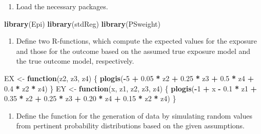 \documentclass[
]{book}
\newenvironment{Shaded}{\begin{snugshade}}{\end{snugshade}}
\newcommand{\ControlFlowTok}[1]{\textcolor[rgb]{0.13,0.29,0.53}{\textbf{#1}}}
\newcommand{\DecValTok}[1]{\textcolor[rgb]{0.00,0.00,0.81}{#1}}
\newcommand{\FloatTok}[1]{\textcolor[rgb]{0.00,0.00,0.81}{#1}}
\newcommand{\FunctionTok}[1]{\textcolor[rgb]{0.13,0.29,0.53}{\textbf{#1}}}
\newcommand{\NormalTok}[1]{#1}
\newcommand{\OtherTok}[1]{\textcolor[rgb]{0.56,0.35,0.01}{#1}}
\newcommand{\SpecialCharTok}[1]{\textcolor[rgb]{0.81,0.36,0.00}{\textbf{#1}}}
\providecommand{\tightlist}{%
  \setlength{\itemsep}{0pt}\setlength{\parskip}{0pt}}
\begin{document}
\begin{enumerate}
\def\labelenumi{\arabic{enumi}.}
\tightlist
\item
  Load the necessary packages.
\end{enumerate}

\begin{Shaded}
\begin{Highlighting}[]
\FunctionTok{library}\NormalTok{(Epi)}
\FunctionTok{library}\NormalTok{(stdReg)}
\FunctionTok{library}\NormalTok{(PSweight)}
\end{Highlighting}
\end{Shaded}

\begin{enumerate}
\def\labelenumi{\arabic{enumi}.}
\setcounter{enumi}{1}
\tightlist
\item
  Define two R-functions, which compute the expected values
  for the exposure and those for the outcome based on the assumed
  true exposure model and the true outcome model, respectively.
\end{enumerate}

\begin{Shaded}
\begin{Highlighting}[]
\NormalTok{EX }\OtherTok{\textless{}{-}} \ControlFlowTok{function}\NormalTok{(z2, z3, z4) \{}
  \FunctionTok{plogis}\NormalTok{(}\SpecialCharTok{{-}}\DecValTok{5} \SpecialCharTok{+} \FloatTok{0.05} \SpecialCharTok{*}\NormalTok{ z2 }\SpecialCharTok{+} \FloatTok{0.25} \SpecialCharTok{*}\NormalTok{ z3 }\SpecialCharTok{+} \FloatTok{0.5} \SpecialCharTok{*}\NormalTok{ z4 }\SpecialCharTok{+} \FloatTok{0.4} \SpecialCharTok{*}\NormalTok{ z2 }\SpecialCharTok{*}\NormalTok{ z4)}
\NormalTok{\}}
\NormalTok{EY }\OtherTok{\textless{}{-}} \ControlFlowTok{function}\NormalTok{(x, z1, z2, z3, z4) \{}
  \FunctionTok{plogis}\NormalTok{(}\SpecialCharTok{{-}}\DecValTok{1} \SpecialCharTok{+}\NormalTok{ x }\SpecialCharTok{{-}} \FloatTok{0.1} \SpecialCharTok{*}\NormalTok{ z1 }\SpecialCharTok{+} \FloatTok{0.35} \SpecialCharTok{*}\NormalTok{ z2 }\SpecialCharTok{+} \FloatTok{0.25} \SpecialCharTok{*}\NormalTok{ z3 }\SpecialCharTok{+}
    \FloatTok{0.20} \SpecialCharTok{*}\NormalTok{ z4 }\SpecialCharTok{+} \FloatTok{0.15} \SpecialCharTok{*}\NormalTok{ z2 }\SpecialCharTok{*}\NormalTok{ z4)}
\NormalTok{\}}
\end{Highlighting}
\end{Shaded}

\begin{enumerate}
\def\labelenumi{\arabic{enumi}.}
\setcounter{enumi}{2}
\tightlist
\item
  Define the function for the generation of data by
  simulating random values from pertinent probability
  distributions based on the given assumptions.
\end{enumerate}
\end{document}

